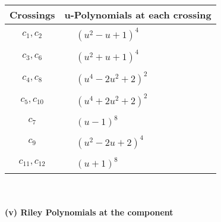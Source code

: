 \documentclass[1p]{elsarticle_modified}
\theoremstyle{definition}
\begin{document}
\begin{tabular}{m{50pt}|m{274pt}}
Crossings & \hspace{64pt}u-Polynomials at each crossing \\
\hline $$\begin{aligned}c_{1},c_{2}\end{aligned}$$&$\begin{aligned}
&(u^2- u+1)^4
\end{aligned}$\\
\hline $$\begin{aligned}c_{3},c_{6}\end{aligned}$$&$\begin{aligned}
&(u^2+u+1)^4
\end{aligned}$\\
\hline $$\begin{aligned}c_{4},c_{8}\end{aligned}$$&$\begin{aligned}
&(u^4-2 u^2+2)^2
\end{aligned}$\\
\hline $$\begin{aligned}c_{5},c_{10}\end{aligned}$$&$\begin{aligned}
&(u^4+2 u^2+2)^2
\end{aligned}$\\
\hline $$\begin{aligned}c_{7}\end{aligned}$$&$\begin{aligned}
&(u-1)^8
\end{aligned}$\\
\hline $$\begin{aligned}c_{9}\end{aligned}$$&$\begin{aligned}
&(u^2-2 u+2)^4
\end{aligned}$\\
\hline $$\begin{aligned}c_{11},c_{12}\end{aligned}$$&$\begin{aligned}
&(u+1)^8
\end{aligned}$\\
\hline
\end{tabular}\\~\\
\newpage\renewcommand{\arraystretch}{1}
\flushleft \textbf{(v) Riley Polynomials at the component}\newline \\
\end{document}
